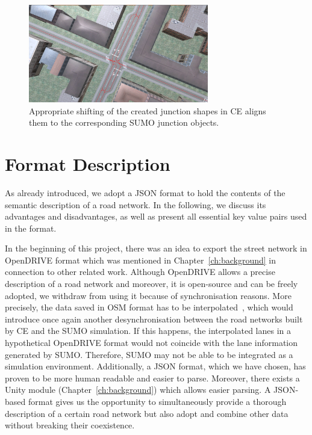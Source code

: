 \begin{figure}[htb]
    \centering
    \includegraphics[width=0.7\textwidth]{figures/fixed}
    \caption{Appropriate shifting of the created junction shapes in CE aligns them to the corresponding SUMO junction objects.}
    \label{fig:fixed}
\end{figure}

\section{Format Description}
\label{sec:format}
As already introduced, we adopt a JSON format to hold the contents of the semantic description of a road network. In the following, we discuss its advantages and disadvantages, as well as present all essential key value pairs used in the format.

In the beginning of this project, there was an idea to export the street network in OpenDRIVE format which was mentioned in Chapter~\ref{ch:background} in connection to other related work. Although OpenDRIVE allows a precise description of a road network and moreover, it is open-source and can be freely adopted, we withdraw from using it because of synchronisation reasons. More precisely, the data saved in OSM format has to be interpolated~\cite{shi2011automatic}, which would introduce once again another desynchronisation between the road networks built by CE and the SUMO simulation. If this happens, the interpolated lanes in a hypothetical OpenDRIVE format would not coincide with the lane information generated by SUMO. Therefore, SUMO may not be able to be integrated as a simulation environment. Additionally, a JSON format, which we have chosen, has proven to be more human readable and easier to parse. Moreover, there exists a Unity module (Chapter~\ref{ch:background}) which allows easier parsing. A JSON-based format gives us the opportunity to simultaneously provide a thorough description of a certain road network but also adopt and combine other data without breaking their coexistence. 

